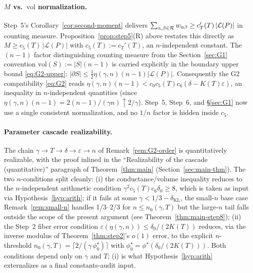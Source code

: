 \paragraph{$M$ vs.\ $\mathrm{vol}$ normalization.}
Step~5's Corollary~\ref{cor:second-moment} delivers
$\sum_{\alpha,\beta\in\mathcal{R}}w_{\alpha\beta}\ge c_T'(T)\,|\mathcal
L(P)|$ in counting measure. Proposition~\ref{prop:step5}(R) above
restates this directly as $M \ge c_5(T)\,|\mathcal L(P)|$ with
$c_5(T) := c_T'(T)$, an $n$-independent constant. The $(n-1)$
factor distinguishing counting measure from the
Section~\ref{sec:G1} convention $\mathrm{vol}(S) := |S|(n-1)$ is
carried explicitly in the boundary upper bound
\eqref{eq:G2-upper}: $|\partial S| \le \tfrac12 \eta(\gamma,n)(n-1)
|\mathcal L(P)|$. Consequently the G2 compatibility
\eqref{eq:G2} reads $\eta(\gamma,n)(n-1) < c_0 c_5(T) c_6 (\delta -
K(T)\varepsilon)$, an inequality in $n$-independent quantities
(since $\eta(\gamma,n)(n-1) = 2(n-1)/(\gamma n) \uparrow 2/\gamma$).
Step~5, Step~6, and \S\ref{sec:G1} now use a single consistent
normalization, and no $1/n$ factor is hidden inside $c_5$.

\paragraph{Parameter cascade realizability.}
The chain $\gamma \to T \to \delta \to \varepsilon \to n$ of
Remark~\ref{rem:G2-order} is quantitatively realizable, with the
proof inlined in the ``Realizability of the cascade (quantitative)''
paragraph of Theorem~\ref{thm:main} (Section~\ref{sec:main-thm}). The
two $n$-conditions split cleanly: (i) the conductance/volume
inequality reduces to the $n$-independent arithmetic condition
$\gamma^2 c_5(T) c_6 \delta_0 \ge 8$, which is taken as input via
Hypothesis~\ref{hyp:arith}; if it fails at some $\gamma < 1/3 -
\delta_{\mathrm{KL}}$, the small-$n$ base case
Remark~\ref{rem:small-n} handles 1/3--2/3 for $n \le n_0(\gamma, T)$
but the large-$n$ tail falls outside the scope of the present
argument (see Theorem~\ref{thm:main-step8}); (ii) the Step~2
fiber error condition $\varepsilon(\eta(\gamma, n)) \le
\delta_0/(2K(T))$ reduces, via the inverse modulus of
Theorem~\ref{thm:step2}'s $o(1)$ error, to the explicit
$n$-threshold
$n_0(\gamma, T) = \lceil 2/(\gamma\, \phi^\star_0)\rceil$ with
$\phi^\star_0 = \phi^\star(\delta_0/(2K(T)))$. Both conditions
depend only on $\gamma$ and $T$; (i) is what
Hypothesis~\ref{hyp:arith} externalizes as a final
constants-audit input.


